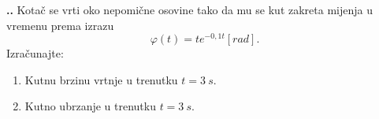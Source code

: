 

\noindent 
\textbf{
\thecjelina.\thezadatak.}
Kotač se vrti oko nepomične osovine tako da mu se kut zakreta mijenja u vremenu
prema izrazu
$$
\varphi(t) = t e^{-0,1t} [rad].
$$
Izra\v{c}unajte:
\begin{enumerate}[label=\alph*)]
 \item Kutnu brzinu vrtnje u trenutku $t=3\ s$.
 \item Kutno ubrzanje u trenutku $t=3\ s$.
\end{enumerate}
